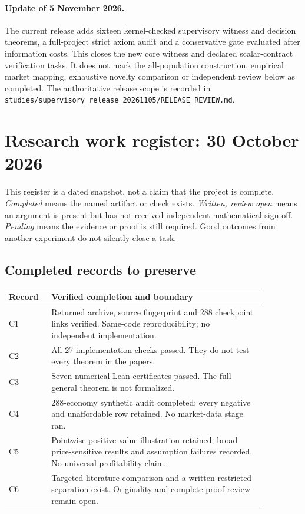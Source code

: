 \paragraph{Update of 5 November 2026.} The current release adds sixteen kernel-checked supervisory witness and decision theorems, a full-project strict axiom audit and a conservative gate evaluated after information costs. This closes the new core witness and declared scalar-contract verification tasks. It does not mark the all-population construction, empirical market mapping, exhaustive novelty comparison or independent review below as completed. The authoritative release scope is recorded in \nolinkurl{studies/supervisory_release_20261105/RELEASE_REVIEW.md}.

\clearpage
\section*{Research work register: 30 October 2026}
\begingroup
\renewcommand{\baselinestretch}{1.08}\selectfont
This register is a dated snapshot, not a claim that the project is complete.
\emph{Completed} means the named artifact or check exists. \emph{Written,
review open} means an argument is present but has not received independent
mathematical sign-off. \emph{Pending} means the evidence or proof is still
required. Good outcomes from another experiment do not silently close a task.

\subsection*{Completed records to preserve}
\begin{center}\small
\setlength{\tabcolsep}{4pt}
\begin{tabular}{@{}p{0.13\linewidth}p{0.73\linewidth}@{}}
\toprule
Record & Verified completion and boundary\\
\midrule
C1 & Returned archive, source fingerprint and 288 checkpoint links verified. Same-code reproducibility; no independent implementation.\\
C2 & All 27 implementation checks passed. They do not test every theorem in the papers.\\
C3 & Seven numerical Lean certificates passed. The full general theorem is not formalized.\\
C4 & 288-economy synthetic audit completed; every negative and unaffordable row retained. No market-data stage ran.\\
C5 & Pointwise positive-value illustration retained; broad price-sensitive results and assumption failures recorded. No universal profitability claim.\\
C6 & Targeted literature comparison and a written restricted separation exist. Originality and complete proof review remain open.\\
\bottomrule
\end{tabular}
\end{center}

